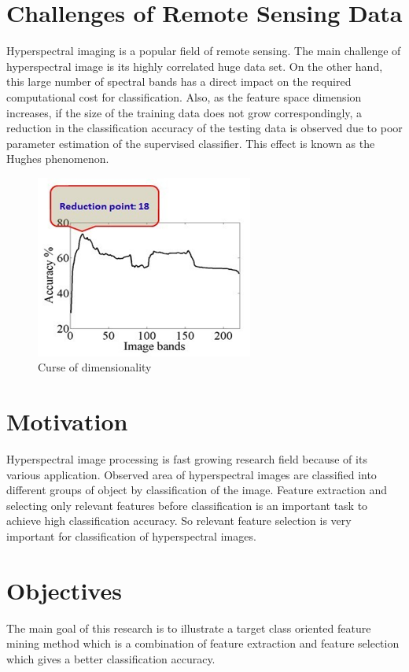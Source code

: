 \documentclass[document.tex]{subfiles}
\begin{document}
\section{Challenges of Remote Sensing Data}
\noindent Hyperspectral imaging is a popular field of remote sensing. The main challenge of hyperspectral image is its highly correlated huge data set. On the other hand, this large number of spectral bands has a direct impact on the required computational cost for classification. Also, as the
feature space dimension increases, if the size of the training data does not grow correspondingly, a reduction in the classification accuracy of the testing data is observed due to poor parameter estimation of the supervised classifier. This effect is known as the Hughes phenomenon\cite{1}.
\begin{figure}[H]
	\begin{center}
		\includegraphics[height=6.0cm]{imgs/curse.png}
	\end{center}
	\caption{Curse of dimensionality}
	\label{fig: Curse of dimensionality}
\end{figure}

\section{Motivation}
\noindent Hyperspectral image processing is fast growing research field because of its various application. Observed area of hyperspectral images are classified into different groups of object by classification of the image. Feature extraction and selecting only relevant features before classification is an important task to achieve high classification accuracy\cite{3}. So relevant feature selection is very important for classification of hyperspectral images. 

\section{Objectives}
\noindent The main goal of this research is to illustrate a target class oriented feature mining method which is a combination of feature extraction and feature selection which gives a better classification accuracy. 
\end{document}
